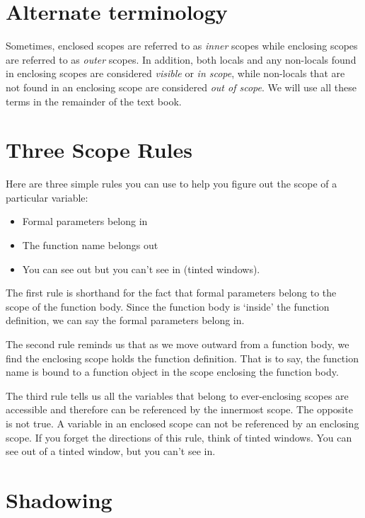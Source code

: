 \section{Alternate terminology}

Sometimes, enclosed scopes are referred to as {\it inner} scopes while
enclosing scopes are referred to as {\it outer} scopes. In addition,
both locals and any non-locals found in enclosing scopes are considered
{\it visible} or {\it in scope}, while non-locals that are not
found in an enclosing scope are considered {\it out of scope}.
We will use all these terms in the remainder of the text book.

\section{Three Scope Rules}

Here are three simple rules you can use to help you
figure out the scope of a particular variable:

\begin{itemize}
\item
        Formal parameters belong in
\item
        The function name belongs out
\item
        You can see out but you can't see in (tinted windows).
\end{itemize}

The first rule is shorthand for the fact that formal parameters
belong to the scope of the function body. Since the function body
is `inside' the function definition, we can say the formal parameters
belong in.

The second rule reminds us that as we move outward from a function body,
we find the enclosing scope holds the function definition. That is to
say, the function name is bound to a function object in the scope
enclosing the function body.

The third rule tells us all the variables that belong to 
ever-enclosing scopes are accessible and therefore
can be referenced by the innermost scope. The opposite is
not true. A variable in an enclosed scope can not be referenced
by an enclosing scope. If you forget the directions of this
rule, think of tinted windows. You can see out of a tinted
window, but you can't see in.

\section{Shadowing}

